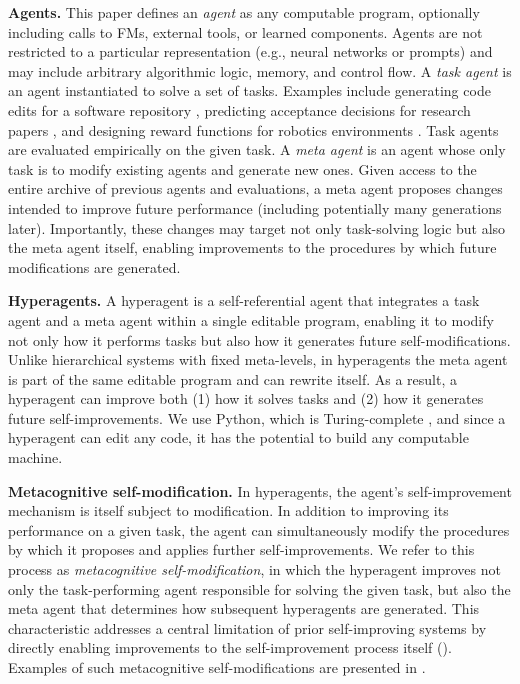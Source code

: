 \documentclass{article}
\begin{document}
\textbf{Agents.} This paper defines an \textit{agent} as any computable program, optionally including calls to FMs, external tools, or learned components. Agents are not restricted to a particular representation (e.g., neural networks or prompts) and may include arbitrary algorithmic logic, memory, and control flow.
A \textit{task agent} is an agent instantiated to solve a set of tasks. Examples include generating code edits for a software repository \citep{gauthier2024polyglot, jimenez2024swebench}, predicting acceptance decisions for research papers \citep{couto2024relevai}, and designing reward functions for robotics environments \citep{maeureka}. Task agents are evaluated empirically on the given task.
A \textit{meta agent} is an agent whose only task is to modify existing agents and generate new ones. Given access to the entire archive of previous agents and evaluations, a meta agent proposes changes intended to improve future performance (including potentially many generations later). Importantly, these changes may target not only task-solving logic but also the meta agent itself, enabling improvements to the procedures by which future modifications are generated.

\textbf{Hyperagents.} A hyperagent is a self-referential agent that integrates a task agent and a meta agent within a single editable program, enabling it to modify not only how it performs tasks but also how it generates future self-modifications. Unlike hierarchical systems with fixed meta-levels, in hyperagents the meta agent is part of the same editable program and can rewrite itself. As a result, a hyperagent can improve both (1) how it solves tasks and (2) how it generates future self-improvements. We use Python, which is Turing-complete \citep{turing1936computable}, and since a hyperagent can edit any code, it has the potential to build any computable machine.

\textbf{Metacognitive self-modification.} In hyperagents, the agent's self-improvement mechanism is itself subject to modification. In addition to improving its performance on a given task, the agent can simultaneously modify the procedures by which it proposes and applies further self-improvements. We refer to this process as \textit{metacognitive self-modification}, in which the hyperagent improves not only the task-performing agent responsible for solving the given task, but also the meta agent that determines how subsequent hyperagents are generated. This characteristic addresses a central limitation of prior self-improving systems \citep{zhang2025darwin, wang2025huxley} by directly enabling improvements to the self-improvement process itself (). Examples of such metacognitive self-modifications are presented in .
\end{document}
